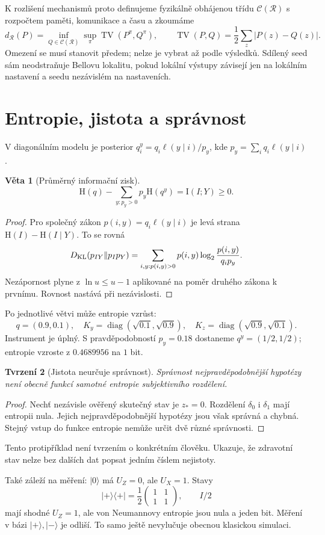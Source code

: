 \documentclass[11pt,a4paper]{article}
\newtheorem{theorem}{Věta}
\newtheorem{proposition}[theorem]{Tvrzení}
\DeclareMathOperator{\TV}{TV}
\DeclareMathOperator{\diag}{diag}
\newcommand{\HH}{\mathrm H}
\newcommand{\II}{\mathrm I}
\begin{document}
K rozlišení mechanismů proto definujeme fyzikálně obhájenou třídu $\mathcal C(\mathcal R)$ s rozpočtem paměti, komunikace a času a zkoumáme
\[
d_{\mathcal R}(P)=\inf_{Q\in\mathcal C(\mathcal R)}
\sup_{\pi}\TV(P^\pi,Q^\pi),\qquad
\TV(P,Q)=\frac12\sum_z|P(z)-Q(z)|.
\]
Omezení se musí stanovit předem; nelze je vybrat až podle výsledků.
Sdílený seed sám neodstraňuje Bellovu lokalitu, pokud lokální výstupy závisejí jen na lokálním nastavení a seedu nezávislém na nastaveních.

\newpage
\section{Entropie, jistota a správnost}
V diagonálním modelu je posterior
$q_i^y=q_i\ell(y\mid i)/p_y$, kde $p_y=\sum_iq_i\ell(y\mid i)$.

\begin{theorem}[Průměrný informační zisk]
\[
\HH(q)-\sum_{y:p_y>0}p_y\HH(q^y)=\II(I;Y)\geq0.
\]
\end{theorem}
\begin{proof}
Pro společný zákon $p(i,y)=q_i\ell(y\mid i)$ je levá strana
$\HH(I)-\HH(I\mid Y)$.
To se rovná
\[
D_{\rm KL}(p_{IY}\Vert p_Ip_Y)
=\sum_{i,y:p(i,y)>0}p(i,y)\log_2\frac{p(i,y)}{q_ip_y}.
\]
Nezápornost plyne z $\ln u\leq u-1$ aplikované na poměr druhého zákona k prvnímu. Rovnost nastává při nezávislosti.
\end{proof}
Po jednotlivé větvi může entropie vzrůst:
\[
q=(0.9,0.1),\quad
K_y=\diag(\sqrt{0.1},\sqrt{0.9}),\quad
K_z=\diag(\sqrt{0.9},\sqrt{0.1}).
\]
Instrument je úplný. S pravděpodobností $p_y=0.18$ dostaneme
$q^y=(1/2,1/2)$; entropie vzroste z $0.4689956$ na $1$ bit.

\begin{proposition}[Jistota neurčuje správnost]
Správnost nejpravděpodobnější hypotézy není obecně funkcí samotné entropie subjektivního rozdělení.
\end{proposition}
\begin{proof}
Nechť nezávisle ověřený skutečný stav je $z_*=0$. Rozdělení
$\delta_0$ i $\delta_1$ mají entropii nula. Jejich nejpravděpodobnější hypotézy jsou však správná a chybná. Stejný vstup do funkce entropie nemůže určit dvě různé správnosti.
\end{proof}
Tento protipříklad není tvrzením o konkrétním člověku. Ukazuje, že zdravotní stav nelze bez dalších dat popsat jedním číslem nejistoty.

Také záleží na měření: $|0\rangle$ má $U_Z=0$, ale $U_X=1$.
Stavy
\[
|+\rangle\langle+|=\frac12\begin{pmatrix}1&1\\1&1\end{pmatrix},
\qquad I/2
\]
mají shodné $U_Z=1$, ale von Neumannovy entropie jsou nula a jeden bit.
Měření v bázi $|+\rangle,|-\rangle$ je odliší. To samo ještě nevylučuje obecnou klasickou simulaci.
\end{document}
